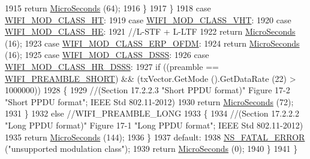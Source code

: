 \begin{DoxyCode}
1915             \textcolor{keywordflow}{return} \hyperlink{group__timecivil_ga17465a639c8d1464e76538afdd78a9f0}{MicroSeconds} (64);
1916           \}
1917       \}
1918     \textcolor{keywordflow}{case} \hyperlink{namespacens3_aa999e1221606a2b21b1eb33c2007c217a6ac45cac36cc4454649435d24ebf349c}{WIFI\_MOD\_CLASS\_HT}:
1919     \textcolor{keywordflow}{case} \hyperlink{namespacens3_aa999e1221606a2b21b1eb33c2007c217a9863e4342bf5c238c74dddfc4d96c67e}{WIFI\_MOD\_CLASS\_VHT}:
1920     \textcolor{keywordflow}{case} \hyperlink{namespacens3_aa999e1221606a2b21b1eb33c2007c217abfa4f7272510045a9b43e8ac27ac13b0}{WIFI\_MOD\_CLASS\_HE}:
1921       \textcolor{comment}{//L-STF + L-LTF}
1922       \textcolor{keywordflow}{return} \hyperlink{group__timecivil_ga17465a639c8d1464e76538afdd78a9f0}{MicroSeconds} (16);
1923     \textcolor{keywordflow}{case} \hyperlink{namespacens3_aa999e1221606a2b21b1eb33c2007c217afc1f5ef8d2c985f37a3224dd86ab014d}{WIFI\_MOD\_CLASS\_ERP\_OFDM}:
1924       \textcolor{keywordflow}{return} \hyperlink{group__timecivil_ga17465a639c8d1464e76538afdd78a9f0}{MicroSeconds} (16);
1925     \textcolor{keywordflow}{case} \hyperlink{namespacens3_aa999e1221606a2b21b1eb33c2007c217aed8070e1ee089724d73fe63030cc112c}{WIFI\_MOD\_CLASS\_DSSS}:
1926     \textcolor{keywordflow}{case} \hyperlink{namespacens3_aa999e1221606a2b21b1eb33c2007c217a3c847bbae970f2de31e7b4eb7ff49840}{WIFI\_MOD\_CLASS\_HR\_DSSS}:
1927       \textcolor{keywordflow}{if} ((preamble == \hyperlink{group__wifi_gga5e94a56cb338a14ffbbb19c6a41251ebab9a39ca1f62d36c33ac489c4cf59745b}{WIFI\_PREAMBLE\_SHORT}) && (txVector.GetMode ().GetDataRate (22) > 
      1000000))
1928         \{
1929           \textcolor{comment}{//(Section 17.2.2.3 "Short PPDU format)" Figure 17-2 "Short PPDU format"; IEEE Std 802.11-2012)}
1930           \textcolor{keywordflow}{return} \hyperlink{group__timecivil_ga17465a639c8d1464e76538afdd78a9f0}{MicroSeconds} (72);
1931         \}
1932       \textcolor{keywordflow}{else} \textcolor{comment}{//WIFI\_PREAMBLE\_LONG}
1933         \{
1934           \textcolor{comment}{//(Section 17.2.2.2 "Long PPDU format)" Figure 17-1 "Long PPDU format"; IEEE Std 802.11-2012)}
1935           \textcolor{keywordflow}{return} \hyperlink{group__timecivil_ga17465a639c8d1464e76538afdd78a9f0}{MicroSeconds} (144);
1936         \}
1937     \textcolor{keywordflow}{default}:
1938       \hyperlink{group__fatal_ga5131d5e3f75d7d4cbfd706ac456fdc85}{NS\_FATAL\_ERROR} (\textcolor{stringliteral}{"unsupported modulation class"});
1939       \textcolor{keywordflow}{return} \hyperlink{group__timecivil_ga17465a639c8d1464e76538afdd78a9f0}{MicroSeconds} (0);
1940     \}
1941 \}
\end{DoxyCode}


